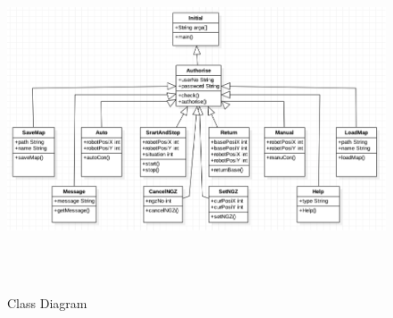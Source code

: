 \documentclass[11pt, a4paper]{article}
\begin{document}
\begin{figure}[H]
\centering
\includegraphics[height=4in]{CD}
\caption[Class Diagram]{Class Diagram}
\end{figure}
\newpage

\end{document}
